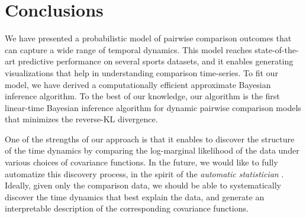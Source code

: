 \section{Conclusions}
\label{sec:conclusions}

We have presented a probabilistic model of pairwise comparison outcomes that can capture a wide range of temporal dynamics.
This model reaches state-of-the-art predictive performance on several sports datasets, and it enables generating visualizations that help in understanding comparison time-series.
To fit our model, we have derived a computationally efficient approximate Bayesian inference algorithm.
To the best of our knowledge, our algorithm is the first linear-time Bayesian inference algorithm for dynamic pairwise comparison models that minimizes the reverse-KL divergence.

One of the strengths of our approach is that it enables to discover the structure of the time dynamics by comparing the log-marginal likelihood of the data under various choices of covariance functions.
In the future, we would like to fully automatize this discovery process, in the spirit of the \emph{automatic statistician} \citep{duvenaud2014automatic}.
Ideally, given only the comparison data, we should be able to systematically discover the time dynamics that best explain the data, and generate an interpretable description of the corresponding covariance functions.
